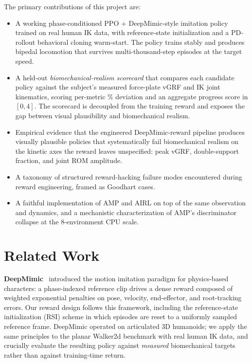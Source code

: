 \documentclass{article}
\begin{document}
The primary contributions of this project are:
\begin{itemize}\setlength\itemsep{1pt}
    \item A working phase-conditioned PPO + DeepMimic-style imitation policy trained on real human IK data, with reference-state initialization and a PD-rollout behavioral cloning warm-start. The policy trains stably and produces bipedal locomotion that survives multi-thousand-step episodes at the target speed.
    \item A held-out \emph{biomechanical-realism scorecard} that compares each candidate policy against the subject's measured force-plate vGRF and IK joint kinematics, scoring per-metric \% deviation and an aggregate progress score in $[0,4]$. The scorecard is decoupled from the training reward and exposes the gap between visual plausibility and biomechanical realism.
    \item Empirical evidence that the engineered DeepMimic-reward pipeline produces visually plausible policies that systematically fail biomechanical realism on the kinetic axes the reward leaves unspecified: peak vGRF, double-support fraction, and joint ROM amplitude.
    \item A taxonomy of structured reward-hacking failure modes encountered during reward engineering, framed as Goodhart cases.
    \item A faithful implementation of AMP and AIRL on top of the same observation and dynamics, and a mechanistic characterization of AMP's discriminator collapse at the 8-environment CPU scale.
\end{itemize}

\section{Related Work}

\textbf{DeepMimic}~\cite{peng2018deepmimic} introduced the motion imitation paradigm for physics-based characters: a phase-indexed reference clip drives a dense reward composed of weighted exponential penalties on pose, velocity, end-effector, and root-tracking errors. Our reward design follows this framework, including the reference-state initialization (RSI) scheme in which episodes are reset to a uniformly sampled reference frame. DeepMimic operated on articulated 3D humanoids; we apply the same principles to the planar Walker2d benchmark with real human IK data, and crucially evaluate the resulting policy against \emph{measured} biomechanical targets rather than against training-time return.
\end{document}
